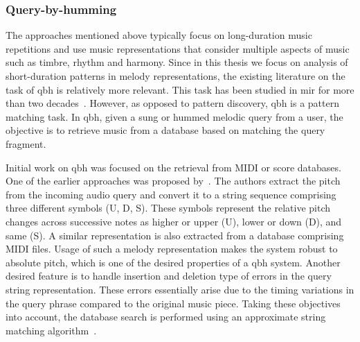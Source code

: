 

\subsubsection{Query-by-humming}
\label{sec:query_by_humming}

The approaches mentioned above typically focus on long-duration music repetitions and use music representations that consider multiple aspects of music such as timbre, rhythm and harmony. Since in this thesis we focus on analysis of short-duration patterns in melody representations, the existing literature on the task of \gls{qbh} is relatively more relevant. This task has been studied in \gls{mir} for more than two decades~\citep{ghias1995query,McNab1996}. However, as opposed to pattern discovery, \gls{qbh} is a pattern matching task. In \gls{qbh}, given a sung or hummed melodic query from a user, the objective is to retrieve music from a database based on matching the query fragment. 

Initial work on \gls{qbh} was focused on the retrieval from MIDI or score databases. One of the earlier approaches was proposed by~\cite{ghias1995query}. The authors extract the pitch from the incoming audio query and convert it to a string sequence comprising three different symbols (U, D, S). These symbols represent the relative pitch changes across successive notes as higher or upper (U), lower or down (D), and same (S). A similar representation is also extracted from a database comprising MIDI files. Usage of such a melody representation makes the system robust to absolute pitch, which is one of the desired properties of a \gls{qbh} system. Another desired feature is to handle insertion and deletion type of errors in the query string representation. These errors essentially arise due to the timing variations in the query phrase compared to the original music piece. Taking these objectives into account, the database search is performed using an approximate string matching algorithm~\citep{baeza1992fast}.

